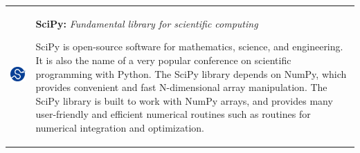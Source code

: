    \begin{center}
    \begin{tabularx}{\textwidth}{rX}
        \begin{minipage}{0.25\columnwidth}
            \begin{center}
            \includegraphics[height=4cm]{./images/scipy_med.png}
            \end{center}
        \end{minipage}
        &
        \begin{minipage}{0.7\columnwidth}
            \textbf{SciPy:} \textit{Fundamental library for scientific computing}
            \vspace{0.5ex}

            \footnotesize{SciPy is open-source software for mathematics,
                science, and engineering. It is also the name of a very popular
                conference on scientific programming with Python. The SciPy
                library depends on NumPy, which provides convenient and fast
                N-dimensional array manipulation. The SciPy library is built to
                work with NumPy arrays, and provides many user-friendly and
                efficient numerical routines such as routines for numerical
            integration and optimization.}

        \end{minipage}
    \end{tabularx}
    \end{center}

\vspace{1ex}
\noindent\hrulefill
\vspace{1ex}

